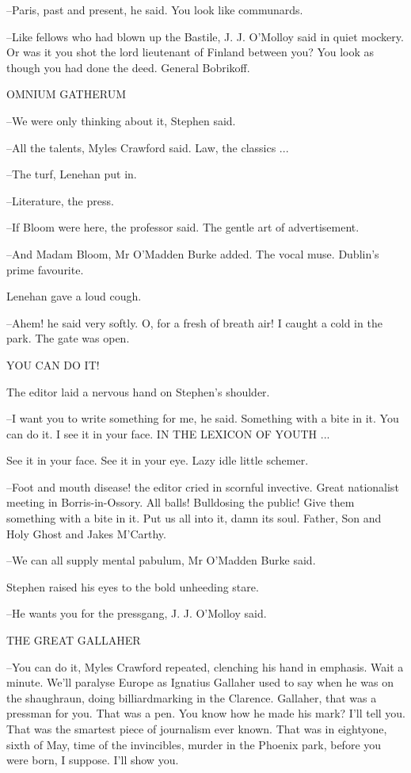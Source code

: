 --Paris, past and present, he said. You look like communards.

--Like fellows who had blown up the Bastile, J. J. O'Molloy said in quiet
mockery. Or was it you shot the lord lieutenant of Finland between you?
You look as though you had done the deed. General Bobrikoff.


    OMNIUM GATHERUM


--We were only thinking about it, Stephen said.

--All the talents, Myles Crawford said. Law, the classics ...

--The turf, Lenehan put in.

--Literature, the press.

--If Bloom were here, the professor said. The gentle art of advertisement.

--And Madam Bloom, Mr O'Madden Burke added. The vocal muse. Dublin's
prime favourite.

 Lenehan gave a loud cough.

--Ahem! he said very softly. O, for a fresh of breath air! I caught a
cold in the park. The gate was open.


    YOU CAN DO IT!


The editor laid a nervous hand on Stephen's shoulder.

--I want you to write something for me, he said. Something with a bite in
it. You can do it. I see it in your face. IN THE LEXICON OF YOUTH ...

See it in your face. See it in your eye. Lazy idle little schemer.

--Foot and mouth disease! the editor cried in scornful invective. Great
nationalist meeting in Borris-in-Ossory. All balls! Bulldosing the public!
Give them something with a bite in it. Put us all into it, damn its soul.
Father, Son and Holy Ghost and Jakes M'Carthy.

--We can all supply mental pabulum, Mr O'Madden Burke said.

Stephen raised his eyes to the bold unheeding stare.

--He wants you for the pressgang, J. J. O'Molloy said.


    THE GREAT GALLAHER


--You can do it, Myles Crawford repeated, clenching his hand in emphasis.
Wait a minute. We'll paralyse Europe as Ignatius Gallaher used to say when
he was on the shaughraun, doing billiardmarking in the Clarence. Gallaher,
that was a pressman for you. That was a pen. You know how he made his
mark? I'll tell you. That was the smartest piece of journalism ever known.
That was in eightyone, sixth of May, time of the invincibles, murder in
the Phoenix park, before you were born, I suppose. I'll show you.

